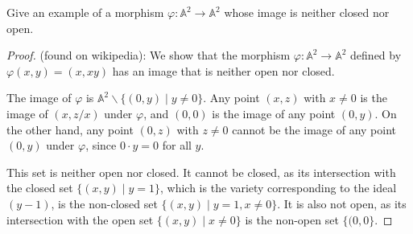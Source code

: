 \documentclass[12pt]{article}
\theoremstyle{definition}
\newenvironment{problem}[2][Problem]{\begin{trivlist}
\item[\hskip \labelsep {\bfseries #1}\hskip \labelsep {\bfseries #2.}]}{\end{trivlist}}
\begin{document}
\begin{problem}{7}
Give an example of a morphism $\varphi : \mathbb A^2 \to  \mathbb A^2$ whose image is neither closed nor open.
\begin{proof}
(found on wikipedia): We show that the morphism $\varphi: \mathbb A^2 \to \mathbb A^2$ defined by $\varphi(x,y) = (x, xy)$ has an image that is neither open nor closed.
\par The image of $\varphi$ is $\mathbb A^2 \backslash \{(0,y) \mid y \neq 0\}$. Any point $(x,z)$ with $x \neq 0$ is the image of $(x, z/x)$ under $\varphi$, and $(0,0)$ is the image of any point $(0,y)$. On the other hand, any point $(0,z)$ with $z \neq 0$ cannot be the image of any point $(0,y)$ under $\varphi$, since $0\cdot y = 0$ for all $y$.
\par This set is neither open nor closed. It cannot be closed, as its intersection with the closed set $\{(x, y) \mid y = 1\}$, which is the variety corresponding to the ideal $(y-1)$, is the non-closed set $\{(x,y) \mid y = 1, x \neq 0\}$. It is also not open, as its intersection with the open set $\{(x,y) \mid x \neq 0\}$ is the non-open set $\{(0,0\}$.
\end{proof}
\end{problem}
\end{document}
